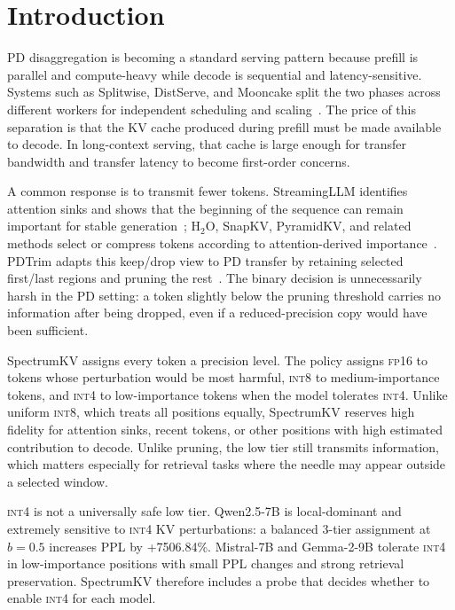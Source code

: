 \documentclass[11pt]{article}
\newcommand{\method}{SpectrumKV}
\newcommand{\budget}{b}
\newcommand{\pct}{\%}
\newcommand{\fp}{\textsc{fp16}}
\newcommand{\intviii}{\textsc{int8}}
\newcommand{\intiv}{\textsc{int4}}
\theoremstyle{plain}
\theoremstyle{definition}
\begin{document}
\section{Introduction}
\label{sec:intro}

PD disaggregation is becoming a standard serving pattern because prefill is parallel and compute-heavy while decode is sequential and latency-sensitive.  Systems such as Splitwise, DistServe, and Mooncake split the two phases across different workers for independent scheduling and scaling~\citep{splitwise,distserve,mooncake}.  The price of this separation is that the KV cache produced during prefill must be made available to decode.  In long-context serving, that cache is large enough for transfer bandwidth and transfer latency to become first-order concerns.

A common response is to transmit fewer tokens.  StreamingLLM identifies attention sinks and shows that the beginning of the sequence can remain important for stable generation~\citep{streamingllm}; H$_2$O, SnapKV, PyramidKV, and related methods select or compress tokens according to attention-derived importance~\citep{h2o,snapkv,pyramidkv,dynamickv}.  PDTrim adapts this keep/drop view to PD transfer by retaining selected first/last regions and pruning the rest~\citep{pdtrim}.  The binary decision is unnecessarily harsh in the PD setting: a token slightly below the pruning threshold carries no information after being dropped, even if a reduced-precision copy would have been sufficient.

\method{} assigns every token a precision level.  The policy assigns \fp{} to tokens whose perturbation would be most harmful, \intviii{} to medium-importance tokens, and \intiv{} to low-importance tokens when the model tolerates \intiv{}.  Unlike uniform \intviii{}, which treats all positions equally, \method{} reserves high fidelity for attention sinks, recent tokens, or other positions with high estimated contribution to decode.  Unlike pruning, the low tier still transmits information, which matters especially for retrieval tasks where the needle may appear outside a selected window.

\intiv{} is not a universally safe low tier.  Qwen2.5-7B is local-dominant and extremely sensitive to \intiv{} KV perturbations: a balanced 3-tier assignment at $\budget=0.5$ increases PPL by +7506.84\pct{}.  Mistral-7B and Gemma-2-9B tolerate \intiv{} in low-importance positions with small PPL changes and strong retrieval preservation.  \method{} therefore includes a probe that decides whether to enable \intiv{} for each model.
\end{document}
